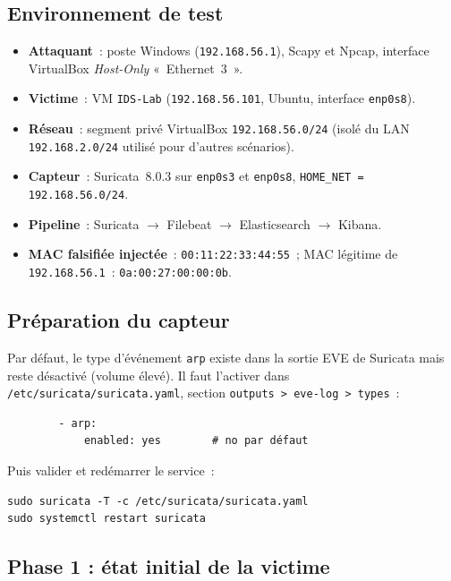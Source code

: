 \documentclass[12pt]{article}
\begin{document}
\subsection{Environnement de test}

\begin{itemize}[nosep]
  \item \textbf{Attaquant}~: poste Windows (\texttt{192.168.56.1}), Scapy et
        Npcap, interface VirtualBox \textit{Host-Only} «~Ethernet~3~».
  \item \textbf{Victime}~: VM \texttt{IDS-Lab} (\texttt{192.168.56.101},
        Ubuntu, interface \texttt{enp0s8}).
  \item \textbf{Réseau}~: segment privé VirtualBox \texttt{192.168.56.0/24}
        (isolé du LAN \texttt{192.168.2.0/24} utilisé pour d'autres scénarios).
  \item \textbf{Capteur}~: Suricata~8.0.3 sur \texttt{enp0s3} et \texttt{enp0s8},
        \texttt{HOME\_NET = 192.168.56.0/24}.
  \item \textbf{Pipeline}~: Suricata $\rightarrow$ Filebeat $\rightarrow$
        Elasticsearch $\rightarrow$ Kibana.
  \item \textbf{MAC falsifiée injectée}~: \texttt{00:11:22:33:44:55}~;
        MAC légitime de \texttt{192.168.56.1}~: \texttt{0a:00:27:00:00:0b}.
\end{itemize}

\subsection{Préparation du capteur}

Par défaut, le type d'événement \texttt{arp} existe dans la sortie EVE de
Suricata mais reste désactivé (volume élevé). Il faut l'activer dans
\texttt{/etc/suricata/suricata.yaml}, section \texttt{outputs > eve-log > types}~:

\begin{verbatim}
        - arp:
            enabled: yes        # no par défaut
\end{verbatim}

Puis valider et redémarrer le service~:

\begin{verbatim}
sudo suricata -T -c /etc/suricata/suricata.yaml
sudo systemctl restart suricata
\end{verbatim}

\subsection{Phase 1 : état initial de la victime}
\end{document}
